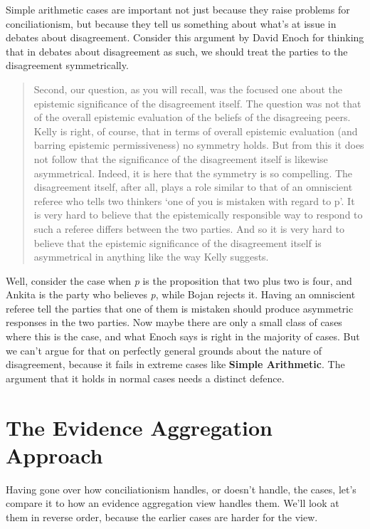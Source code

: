 Simple arithmetic cases are important not just because they raise problems for conciliationism, but because they tell us something about what's at issue in debates about disagreement. Consider this argument by David Enoch for thinking that in debates about disagreement as such, we should treat the parties to the disagreement symmetrically.

\begin{quote}
Second, our question, as you will recall, was the focused one about the epistemic significance of the disagreement itself. The question was not that of the overall epistemic evaluation of the beliefs of the disagreeing peers. Kelly is right, of course, that in terms of overall epistemic evaluation (and barring epistemic permissiveness) no symmetry holds. But from this it does not follow that the significance of the disagreement itself is likewise asymmetrical. Indeed, it is here that the symmetry is so compelling. The disagreement itself, after all, plays a role similar to that of an omniscient referee who tells two thinkers `one of you is mistaken with regard to p'. It is very hard to believe that the epistemically responsible way to respond to such a referee differs between the two parties. And so it is very hard to believe that the epistemic significance of the disagreement itself is asymmetrical in anything like the way Kelly suggests. ~\citep[657]{Enoch2010}
\end{quote}
Well, consider the case when \emph{p} is the proposition that two plus two is four, and \gls{Ankita} is the party who believes \emph{p}, while \gls{Bojan} rejects it. Having an omniscient referee tell the parties that one of them is mistaken should produce asymmetric responses in the two parties. Now maybe there are only a small class of cases where this is the case, and what Enoch says is right in the majority of cases. But we can't argue for that on perfectly general grounds about the nature of disagreement, because it fails in extreme cases like \textbf{Simple Arithmetic}. The argument that it holds in normal cases needs a distinct defence.

\section{The Evidence Aggregation Approach}
\label{theevidenceaggregationapproach}

Having gone over how conciliationism handles, or doesn't handle, the cases, let's compare it to how an evidence aggregation view handles them. We'll look at them in reverse order, because the earlier cases are harder for the view.

